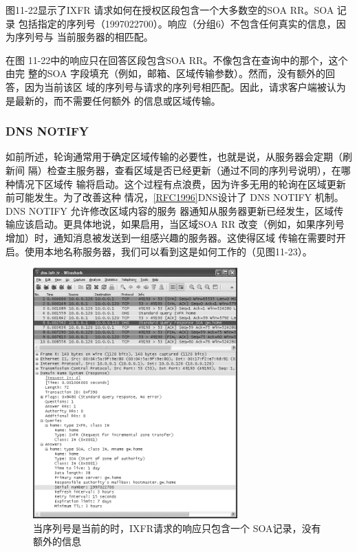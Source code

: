 图11-22显示了IXFR 请求如何在授权区段包含一个大多数空的SOA RR。SOA 记录
包括指定的序列号（1997022700）。响应（分组6）不包含任何真实的信息，因为序列号与
当前服务器的相匹配。

在图 11-22中的响应只在回答区段包含SOA RR。不像包含在查询中的那个，这个由完
整的SOA 字段填充（例如，邮箱、区域传输参数）。然而，没有额外的回答，因为当前该区
域的序列号与请求的序列号相匹配。因此，请求客户端被认为是最新的，而不需要任何额外
的信息或区域传输。

\subsubsection{DNS NOTIFY}

如前所述，轮询通常用于确定区域传输的必要性，也就是说，从服务器会定期（刷新间
隔）检查主服务器，查看区域是否已经更新（通过不同的序列号说明），在哪种情况下区域传
输将启动。这个过程有点浪费，因为许多无用的轮询在区域更新前可能发生。为了改善这种
情况，\href{https://www.rfc-editor.org/rfc/rfc1996}{[RFC1996]}DNS设计了 DNS NOTIFY 机制。DNS NOTIFY 允许修改区域内容的服务
器通知从服务器更新已经发生，区域传输应该启动。更具体地说，如果启用，当区域SOA
RR 改变（例如，如果序列号增加）时，通知消息被发送到一组感兴趣的服务器。这使得区域
传输在需要时开启。使用本地名称服务器，我们可以看到这是如何工作的（见图11-23）。

\begin{figure}[!htb]
    \centering
	\includegraphics[width=0.7\textwidth]{imgs/11/11-22.png}
	\caption{当序列号是当前的时，IXFR请求的响应只包含一个 SOA记录，没有额外的信息}
\end{figure}

